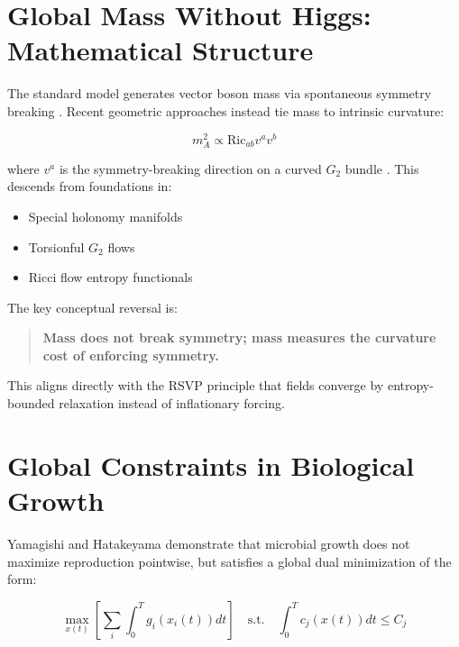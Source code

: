 \documentclass[11pt,a4paper]{article}
\begin{document}
\section{Global Mass Without Higgs: Mathematical Structure}

The standard model generates vector boson mass via spontaneous symmetry breaking \citep{Higgs1964}. Recent geometric approaches instead tie mass to intrinsic curvature:

\begin{equation}
m_A^2 \propto \mathrm{Ric}_{ab} v^a v^b
\end{equation}

where $v^a$ is the symmetry-breaking direction on a curved $G_2$ bundle \citep{Pincak2025}.  
This descends from foundations in:

\begin{itemize}
    \item Special holonomy manifolds \citep{Joyce2000}
    \item Torsionful $G_2$ flows \citep{Bryant2006}
    \item Ricci flow entropy functionals \citep{Perelman2002}
\end{itemize}

The key conceptual reversal is:

\begin{quote}
\textbf{Mass does not break symmetry; mass measures the curvature cost of enforcing symmetry.}
\end{quote}

This aligns directly with the RSVP principle that fields converge by entropy-bounded relaxation instead of inflationary forcing.

\section{Global Constraints in Biological Growth}

Yamagishi and Hatakeyama \citeyearpar{Yamagishi2025} demonstrate that microbial growth does not maximize reproduction pointwise, but satisfies a global dual minimization of the form:

\begin{equation}
\max_{x(t)} \left[ \sum_i \int_0^T g_i(x_i(t)) dt \right] 
\quad \text{s.t.} \quad 
\int_0^T c_j(x(t)) dt \leq C_j
\end{equation}
\end{document}
